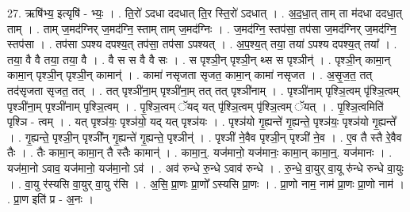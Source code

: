 \documentclass[17pt]{extarticle}
\begin{document}
27. ऋषि॑भ्य॒ इत्यृषि॑ - भ्यः॒ । . ति॒रो॑ ऽदधा ददधात् ति॒र स्ति॒रो॑ ऽदधात् । . अ॒द॒धा॒त् ताम् ता म॑दधा ददधा॒त् ताम् । . ताम् ज॒मद॑ग्निर् ज॒मद॑ग्नि॒ स्ताम् ताम् ज॒मद॑ग्निः । . ज॒मद॑ग्नि॒ स्तप॑सा॒ तप॑सा ज॒मद॑ग्निर् ज॒मद॑ग्नि॒ स्तप॑सा । . तप॑सा ऽपश्य दपश्य॒त् तप॑सा॒ तप॑सा ऽपश्यत् । . अ॒प॒श्य॒त् तया॒ तया॑ ऽपश्य दपश्य॒त् तया᳚ । . तया॒ वै वै तया॒ तया॒ वै । . वै स स वै वै सः । . स पृश्ञी॒न् पृश्ञी॒न् थ्स स पृश्ञीन्॑ । . पृश्ञी॒न् कामा॒न् कामा॒न् पृश्ञी॒न् पृश्ञी॒न् कामान्॑ । . कामा॑ नसृजता सृजत॒ कामा॒न् कामा॑ नसृजत । . अ॒सृ॒ज॒त॒ तत् तद॑सृजता सृजत॒ तत् । . तत् पृश्ञी॑ना॒म् पृश्ञी॑ना॒म् तत् तत् पृश्ञी॑नाम् । . पृश्ञी॑नाम् पृश्ञि॒त्वम् पृ॑श्ञि॒त्वम् पृश्ञी॑ना॒म् पृश्ञी॑नाम् पृश्ञि॒त्वम् । . पृ॒श्ञि॒त्वम् ॅयद् यत् पृ॑श्ञि॒त्वम् पृ॑श्ञि॒त्वम् ॅयत् । . पृ॒श्ञि॒त्वमिति॑ पृश्ञि - त्वम् । . यत् पृश्ञ॑यः॒ पृश्ञ॑यो॒ यद् यत् पृश्ञ॑यः । . पृश्ञ॑यो गृ॒ह्यन्ते॑ गृ॒ह्यन्ते॒ पृश्ञ॑यः॒ पृश्ञ॑यो गृ॒ह्यन्ते᳚ । . गृ॒ह्यन्ते॒ पृश्ञी॒न् पृश्ञी᳚न् गृ॒ह्यन्ते॑ गृ॒ह्यन्ते॒ पृश्ञीन्॑ । . पृश्ञी॑ ने॒वैव पृश्ञी॒न् पृश्ञी॑ ने॒व । . ए॒व तै स्तै रे॒वैव तैः । . तैः कामा॒न् कामा॒न् तै स्तैः कामान्॑ । . कामा॒न्॒. यज॑मानो॒ यज॑मानः॒ कामा॒न् कामा॒न्॒. यज॑मानः । . यज॑मा॒नो ऽवाव॒ यज॑मानो॒ यज॑मा॒नो ऽव॑ । . अव॑ रुन्धे रु॒न्धे ऽवाव॑ रुन्धे । . रु॒न्धे॒ वा॒युर् वा॒यू रु॑न्धे रुन्धे वा॒युः । . वा॒यु र॑स्यसि वा॒युर् वा॒यु र॑सि । . अ॒सि॒ प्रा॒णः प्रा॒णो᳚ ऽस्यसि प्रा॒णः । . प्रा॒णो नाम॒ नाम॑ प्रा॒णः प्रा॒णो नाम॑ । . प्रा॒ण इति॑ प्र - अ॒नः । \newline
\end{document}
